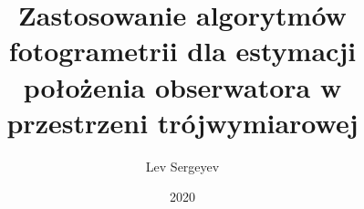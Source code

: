 \documentclass[eng, draft, openany]{mgr} %
\title{Zastosowanie algorytmów fotogrametrii dla estymacji położenia obserwatora w przestrzeni trójwymiarowej}
\author{Lev Sergeyev}
\date{2020} %
\begin{document}

\maketitle

\tableofcontents
\listoffigures

\relax







\end{document}
